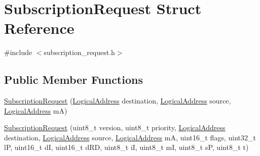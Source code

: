 \hypertarget{structSubscriptionRequest}{}\section{Subscription\+Request Struct Reference}
\label{structSubscriptionRequest}


{\ttfamily \#include $<$subscription\+\_\+request.\+h$>$}

\subsection*{Public Member Functions}
\begin{DoxyCompactItemize}
\item 
\hyperlink{structSubscriptionRequest_a3b6895bbe1f616836913b7681b87a852}{Subscription\+Request} (\hyperlink{structLogicalAddress}{Logical\+Address} destination, \hyperlink{structLogicalAddress}{Logical\+Address} source, \hyperlink{structLogicalAddress}{Logical\+Address} mA)
\item 
\hyperlink{structSubscriptionRequest_a1fb7f2d417847d7df52ce23d00f632a6}{Subscription\+Request} (uint8\+\_\+t version, uint8\+\_\+t priority, \hyperlink{structLogicalAddress}{Logical\+Address} destination, \hyperlink{structLogicalAddress}{Logical\+Address} source, \hyperlink{structLogicalAddress}{Logical\+Address} mA, uint16\+\_\+t flags, uint32\+\_\+t lP, uint16\+\_\+t dI, uint16\+\_\+t d\+RD, uint8\+\_\+t iI, uint8\+\_\+t mI, uint8\+\_\+t sP, uint8\+\_\+t t)
\end{DoxyCompactItemize}
